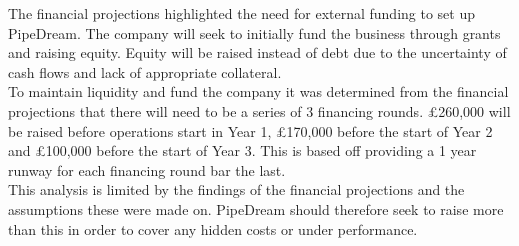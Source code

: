\documentclass[11pt]{article}		%
\newcommand{\figref}[1]{\hyperref[#1]{Figure \ref*{#1}}}    %
\begin{document}
		  The financial projections highlighted the need for external funding to set up PipeDream. The company will seek to initially fund the business through grants and raising equity. Equity will be raised instead of debt due to the uncertainty of cash flows and lack of appropriate collateral.
		\\ 
        \hspace*{2ex}To maintain liquidity and fund the company it was determined from the financial projections that there will need to be a series of 3 financing rounds. £260,000 will be raised before operations start in Year 1, £170,000 before the start of Year 2 and £100,000 before the start of Year 3. This is based off providing a 1 year runway for each financing round bar the last. \\ 
        \hspace*{2ex}This analysis is limited by the findings of the financial projections and the assumptions these were made on. PipeDream should therefore seek to raise more than this in order to cover any hidden costs or under performance.%
 
            
            
\end{document}
